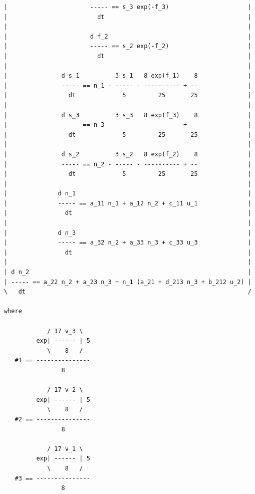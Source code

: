 {\begin{verbatim}
|                       ----- == s_3 exp(-f_3)                      |
|                         dt                                        |
|                                                                   |
|                       d f_2                                       |
|                       ----- == s_2 exp(-f_2)                      |
|                         dt                                        |
|                                                                   |
|               d s_1          3 s_1   8 exp(f_1)    8              |
|               ----- == n_1 - ----- - ---------- + --              |
|                 dt             5         25       25              |
|                                                                   |
|               d s_3          3 s_3   8 exp(f_3)    8              |
|               ----- == n_3 - ----- - ---------- + --              |
|                 dt             5         25       25              |
|                                                                   |
|               d s_2          3 s_2   8 exp(f_2)    8              |
|               ----- == n_2 - ----- - ---------- + --              |
|                 dt             5         25       25              |
|                                                                   |
|              d n_1                                                |
|              ----- == a_11 n_1 + a_12 n_2 + c_11 u_1              |
|                dt                                                 |
|                                                                   |
|              d n_3                                                |
|              ----- == a_32 n_2 + a_33 n_3 + c_33 u_3              |
|                dt                                                 |
|                                                                   |
| d n_2                                                             |
| ----- == a_22 n_2 + a_23 n_3 + n_1 (a_21 + d_213 n_3 + b_212 u_2) |
\   dt                                                              /

where

            / 17 v_3 \
         exp| ------ | 5
            \    8   /
   #1 == ---------------
                8

            / 17 v_2 \
         exp| ------ | 5
            \    8   /
   #2 == ---------------
                8

            / 17 v_1 \
         exp| ------ | 5
            \    8   /
   #3 == ---------------
                8


\end{verbatim} 
\color{black} 

}
    

